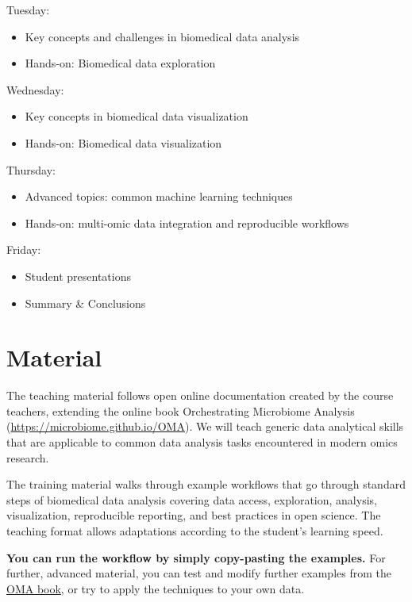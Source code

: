 \documentclass[
  oneside]{book}
\providecommand{\tightlist}{%
  \setlength{\itemsep}{0pt}\setlength{\parskip}{0pt}}
\begin{document}
Tuesday:

\begin{itemize}
\tightlist
\item
  Key concepts and challenges in biomedical data analysis
\item
  Hands-on: Biomedical data exploration
\end{itemize}

Wednesday:

\begin{itemize}
\tightlist
\item
  Key concepts in biomedical data visualization
\item
  Hands-on: Biomedical data visualization
\end{itemize}

Thursday:

\begin{itemize}
\tightlist
\item
  Advanced topics: common machine learning techniques
\item
  Hands-on: multi-omic data integration and reproducible workflows
\end{itemize}

Friday:

\begin{itemize}
\tightlist
\item
  Student presentations
\item
  Summary \& Conclusions
\end{itemize}

\hypertarget{material}{%
\section{Material}\label{material}}

The teaching material follows open online documentation created by the
course teachers, extending the online book Orchestrating Microbiome
Analysis (\url{https://microbiome.github.io/OMA}). We will teach generic
data analytical skills that are applicable to common data analysis
tasks encountered in modern omics research.

The training material walks through example workflows that go through
standard steps of biomedical data analysis covering data access,
exploration, analysis, visualization, reproducible reporting, and best
practices in open science. The teaching format allows adaptations
according to the student's learning speed.

\textbf{You can run the workflow by simply copy-pasting the
examples.} For further, advanced material, you can test and modify
further examples from the \href{https://microbiome.github.io/OMA}{OMA
book}, or try to apply the
techniques to your own data.
\end{document}
